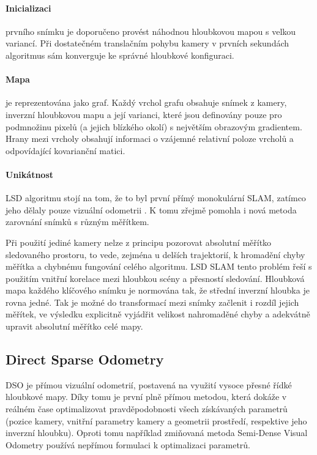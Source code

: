 \documentclass[12pt,a4paper]{article}
\begin{document}
\paragraph{Inicializaci} prvního snímku je doporučeno provést náhodnou hloubkovou mapou s velkou variancí. Při dostatečném translačním pohybu kamery v prvních sekundách algoritmus sám konverguje ke správné hloubkové konfiguraci.

\paragraph{Mapa} je reprezentována jako graf. Každý vrchol grafu obsahuje snímek z kamery, inverzní hloubkovou mapu a její varianci, které jsou definovány pouze pro podmnožinu pixelů (a jejich blízkého okolí) s největším obrazovým gradientem. Hrany mezi vrcholy obsahují informaci o vzájemné relativní poloze vrcholů a odpovídající kovarianční matici.

\paragraph{Unikátnost} LSD algoritmu stojí na tom, že to byl první přímý monokulární SLAM, zatímco jeho  dělaly pouze vizuální odometrii \cite{Engel14_LSD}. K tomu zřejmě pomohla i nová metoda zarovnání snímků s různým měřítkem. 

Při použití jediné kamery nelze z principu pozorovat absolutní měřítko sledovaného prostoru, to vede, zejména u delších trajektorií, k hromadění chyby měřítka a chybnému fungování celého algoritmu. LSD SLAM tento problém řeší s použitím vnitřní korelace mezi hloubkou scény a přesností sledování. Hloubková mapa každého klíčového snímku je normována tak, že střední inverzní hloubka je rovna jedné. Tak je možné do transformací mezi snímky začlenit i rozdíl jejich měřítek, ve výsledku explicitně vyjádřit velikost nahromaděné chyby a adekvátně upravit absolutní měřítko celé mapy.

\subsection{Direct Sparse Odometry}
DSO je přímou vizuální odometrií, postavená na využití vysoce přesné řídké hloubkové mapy. Díky tomu je první plně přímou metodou, která dokáže v reálném čase optimalizovat pravděpodobnosti všech získávaných parametrů (pozice kamery, vnitřní parametry kamery a geometrii prostředí, respektive jeho inverzní hloubku). Oproti tomu například zmiňovaná metoda Semi-Dense Visual Odometry používá nepřímou formulaci k optimalizaci parametrů.
\end{document}
